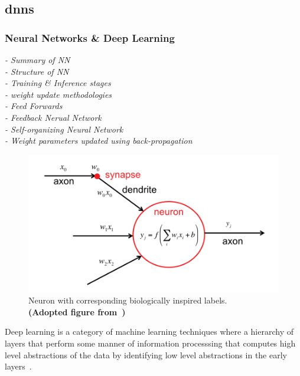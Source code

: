 \documentclass[11pt]{article}
\begin{document}
\subsection{\Acrlong*{dnn}s}\label{subsec:deepLearning}
\subsubsection{Neural Networks \& Deep Learning}
\emph{
    - Summary of NN\\
    - Structure of NN\\
    - Training \& Inference stages\\
    - weight update methodologies\\
    - Feed Forwards\\
    - Feedback Nerual Network\\
    - Self-organizing Neural Network\\
    - Weight parameters updated using back-propagation\\
}
\begin{figure}
    \includegraphics[width=1\textwidth]{Perceptron_efficient_proc.png}
    \caption{Neuron with corresponding biologically inspired labels.\\ \textbf{(Adopted figure from~\autocite{szeEfficientProcessingDeep2017})}}
    \label{fig:neuronLabeled}
\end{figure}
Deep learning is a category of machine learning techniques where a hierarchy of layers that perform some manner of information processsing that computes high level abstractions of the data by identifying low level abstractions in the early layers~\autocite{dengTutorialSurveyArchitectures2014}.\\
\end{document}
